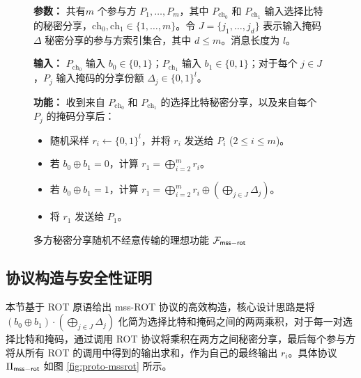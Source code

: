 \begin{figure}[!htb]
\centering
\begin{framed}
\begin{trivlist}
    \item \textbf{参数：} 共有$m$ 个参与方 $P_1, \dots, P_m$，其中 $P_{\text{ch}_0}$ 和 $P_{\text{ch}_1}$ 输入选择比特的秘密分享，$\text{ch}_0, \text{ch}_1 \in \{1, \dots, m\}$。令 $J = \{j_1, \dots, j_d\}$ 表示输入掩码 $\Delta$ 秘密分享的参与方索引集合，其中 $d \le m$。消息长度为 $l$。
    \item \textbf{输入：} $P_{\text{ch}_0}$ 输入 $b_0 \in \{0, 1\}$；$P_{\text{ch}_1}$ 输入 $b_1 \in \{0, 1\}$；对于每个 $j \in J$，$P_j$ 输入掩码的分享份额 $\Delta_j \in \{0, 1\}^l$。
    \item \textbf{功能：} 收到来自 $P_{\text{ch}_0}$ 和 $P_{\text{ch}_1}$ 的选择比特秘密分享，以及来自每个 $P_j$ 的掩码分享后：
    \begin{itemize}
        \item 随机采样 $r_i \leftarrow \{0, 1\}^l$，并将 $r_i$ 发送给 $P_i$ ($2 \le i \le m$)。
        \item 若 $b_0 \oplus b_1 = 0$，计算 $r_1 = \bigoplus_{i=2}^m r_i$。
        \item 若 $b_0 \oplus b_1 = 1$，计算 $r_1 = \bigoplus_{i=2}^m r_i \oplus (\bigoplus_{j \in J} \Delta_j)$。
        \item 将 $r_1$ 发送给 $P_1$。
    \end{itemize}
\end{trivlist}
\end{framed}
\caption{多方秘密分享随机不经意传输的理想功能 $\mathcal{F}_\mathsf{mss\mathsf{-}rot}$}\label{fig:func-mssrot}
\end{figure}

\subsection{协议构造与安全性证明}

本节基于 ROT 原语给出 mss-ROT 协议的高效构造，核心设计思路是将 $(b_0 \oplus b_1) \cdot (\bigoplus_{j \in J} \Delta_j)$ 化简为选择比特和掩码之间的两两乘积，对于每一对选择比特和掩码，通过调用 ROT 协议将乘积在两方之间秘密分享，最后每个参与方将从所有 ROT 的调用中得到的输出求和，作为自己的最终输出 $r_i$。具体协议 $\Pi_\mathsf{mss\mathsf{-}rot}$ 如图 \ref{fig:proto-mssrot} 所示。

